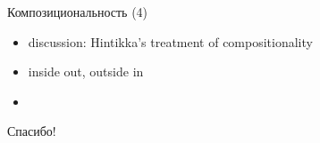 \documentclass{beamer}
\begin{document}
\begin{frame}{Композициональность (4)}
\begin{itemize}
	\item discussion: Hintikka's treatment of compositionality
	\item inside out, outside in
	\item 
\end{itemize}
\end{frame}


\begin{frame}{}
    \thispagestyle{empty}
    \begin{center}
        {\large Спасибо!}
    \end{center}
\end{frame}


\end{document}
